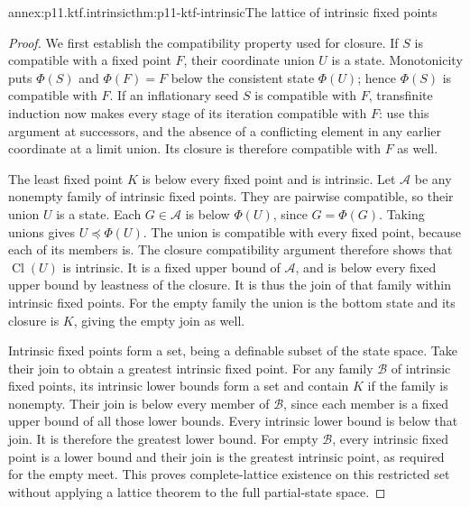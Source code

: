 \begin{annexitem}{annex:p11.ktf.intrinsic}{thm:p11-ktf-intrinsic}{The lattice of intrinsic fixed points}
\begin{proof}
We first establish the compatibility property used for closure. If
\(S\) is compatible with a fixed point \(F\), their coordinate
union \(U\) is a state. Monotonicity puts \(\Phi(S)\) and
\(\Phi(F)=F\) below the consistent state \(\Phi(U)\); hence
\(\Phi(S)\) is compatible with \(F\). If an inflationary seed
\(S\) is compatible with \(F\), transfinite induction now makes
every stage of its iteration compatible with \(F\): use this argument
at successors, and the absence of a conflicting element in any earlier
coordinate at a limit union. Its closure is therefore compatible with
\(F\) as well.

The least fixed point \(K\) is below every fixed point and is intrinsic.
Let \(\mathcal A\) be any nonempty family of intrinsic fixed points.
They are pairwise compatible, so their union \(U\) is a state.
Each \(G\in\mathcal A\) is below \(\Phi(U)\), since
\(G=\Phi(G)\). Taking unions gives \(U\preceq\Phi(U)\).
The union is compatible with every fixed point, because each of its
members is. The closure compatibility argument therefore shows that
\(\operatorname{Cl}(U)\) is intrinsic. It is a fixed upper bound
of \(\mathcal A\), and is below every fixed upper bound by leastness
of the closure. It is thus the join of that family within intrinsic
fixed points. For the empty family the union is the bottom state and
its closure is \(K\), giving the empty join as well.

Intrinsic fixed points form a set, being a definable subset of the state
space. Take their join to obtain a greatest intrinsic fixed point.
For any family \(\mathcal B\) of intrinsic fixed points, its intrinsic
lower bounds form a set and contain \(K\) if the family is nonempty.
Their join is below every member of \(\mathcal B\), since each member
is a fixed upper bound of all those lower bounds. Every intrinsic lower
bound is below that join. It is therefore the greatest lower bound.
For empty \(\mathcal B\), every intrinsic fixed point is a lower
bound and their join is the greatest intrinsic point, as required for
the empty meet. This proves complete-lattice existence on this restricted
set without applying a lattice theorem to the full partial-state space.
\end{proof}
\end{annexitem}


